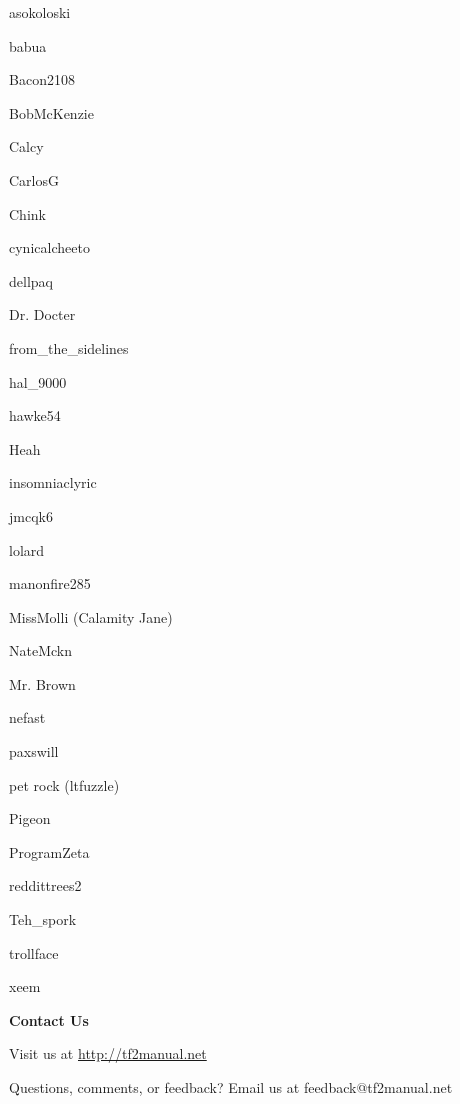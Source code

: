 \begin{multicols}{3}
asokoloski

babua

Bacon2108

BobMcKenzie

Calcy

CarlosG

Chink

cynicalcheeto

dellpaq

Dr. Docter

from\_the\_sidelines

hal\_9000

hawke54

Heah

insomniaclyric

jmcqk6

lolard

manonfire285

MissMolli (Calamity Jane)

NateMckn

Mr. Brown

nefast

paxswill

pet rock (ltfuzzle)

Pigeon

ProgramZeta

reddittrees2

Teh\_spork

trollface

xeem
 
\end{multicols}
\newpage %
{\bf Contact Us}

Visit us at \url{http://tf2manual.net}

Questions, comments, or feedback? Email us at feedback@tf2manual.net